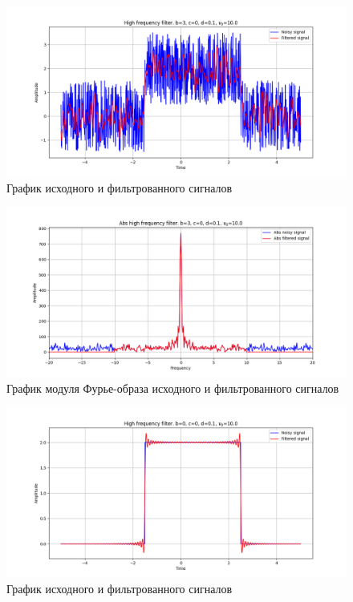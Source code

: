\documentclass[a4paper, 12pt]{article}
\begin{document}
    \begin{figure}[!htb]
        \centering
        \includegraphics[scale=0.485]{5_u_flt_u_nohigh.png}
        \captionsetup{skip=0pt}
        \caption{График исходного и фильтрованного сигналов}
        \label{fig:fig7}
    \end{figure}
    \begin{figure}[!htb]
        \centering
        \includegraphics[scale=0.485]{5_abs_u_U_nohigh.png}
        \captionsetup{skip=0pt}
        \caption{График модуля Фурье-образа исходного и фильтрованного сигналов}
        \label{fig:fig8}
    \end{figure}
    \begin{figure}[!htb]
        \centering
        \includegraphics[scale=0.485]{4_u_flt_u_nohigh.png}
        \captionsetup{skip=0pt}
        \caption{График исходного и фильтрованного сигналов}
        \label{fig:fig9}
    \end{figure}
\end{document}

